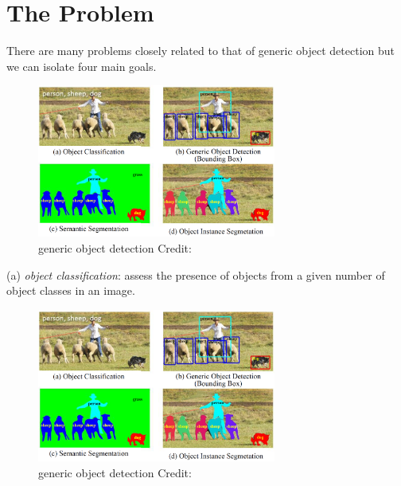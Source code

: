 \documentclass{beamer}
\begin{document}
\section{The Problem}


\begin{frame}{}
    There are many problems closely related to that of generic object detection but we can isolate four main goals.
    \begin{figure}
        \includegraphics[width=0.7\textwidth]{images/detector_type.PNG}
        \caption{generic object detection
        \hbox{\scriptsize Credit:}
        }
    \end{figure}
\end{frame}

\begin{frame}{}
    (a) \emph{object classification}: assess the presence of objects from a given number of object classes in an image.
    \begin{figure}
        \includegraphics[width=0.7\textwidth]{images/detector_type.PNG}
        \caption{generic object detection
        \hbox{\scriptsize Credit:}
        }
    \end{figure}
\end{frame}
\end{document}
